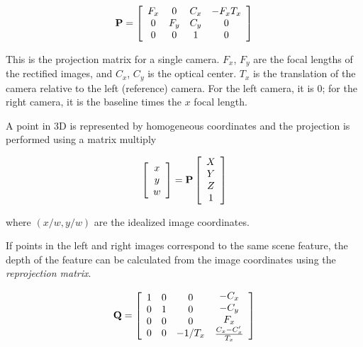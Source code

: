 \documentclass[twocolumn,oneside]{book}
\def\vec#1{\begin{array}{c}#1\end{array}}
\begin{document}
\begin{eqnarray}
\bf{P} =
\left[ 
\vec{F_x \\ 0 \\ 0}
\vec{ 0\\ F_y \\ 0}
\vec{ C_x \\ C_y \\ 1}
\vec{ -F_x T_x \\ 0 \\ 0} 
\right]
\end{eqnarray}

This is the projection matrix for a single camera.  $F_x$, $F_y$ are
the focal lengths of the rectified images, and $C_x$,
$C_y$ is the optical center.  $T_x$ is the translation of
the camera relative to the left (reference) camera.  For the left
camera, it is 0; for the right camera, it is the baseline times the
$x$ focal length.

A point in 3D is represented by homogeneous coordinates and the
projection is performed using a matrix multiply

\begin{eqnarray}
\left[
\vec{x\\ y\\ w}
\right] 
=
 \bf{P} \left[ \vec{X\\ Y\\ Z \\ 1} \right]
\end{eqnarray}
 
\noindent where $(x/w, y/w)$ are the idealized image coordinates.

If points in the left and right images correspond to the same scene
feature, the depth of the feature can be calculated from the image
coordinates using the {\em reprojection matrix}.

\begin{eqnarray}
\bf{Q} =
\left[ 
\vec{1 \\ 0 \\ 0 \\ 0}
\vec{0 \\ 1 \\ 0 \\ 0}
\vec{0 \\ 0 \\ 0 \\ -1/T_x}
\vec{-C_x \\ -C_y \\ F_x \\ \frac{C_x - C_x'}{T_x}} 
\right]
\end{eqnarray}
\end{document}
